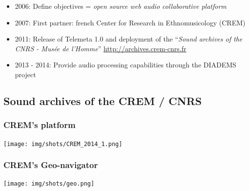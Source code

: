 \documentclass[10pt, final, hyperref, table]{beamer}
\newcommand{\dchref}[1]{
    \href{#1}{\color{rouge}\underline{#1}}
}
\begin{document}
\begin{frame}
\begin{block}
\begin{itemize}
      \item \alert{2006}: Define objectives = \emph{open source web
          audio collaborative platform}
      \item \alert{2007}: First partner: french Center for Research in
        Ethnomusicology (CREM)
      \item \alert{2011}: Release of \alert{Telemeta 1.0} and
        deployment of the ``\emph{Sound archives of the CNRS
          - Musée de l'Homme}'' \dchref{http://archives.crem-cnrs.fr}
      \item \alert{2013 - 2014}: Provide audio processing capabilities through the DIADEMS project 
      \end{itemize}
    \end{block}
  
\end{frame}




\subsection{Sound archives of the CREM / CNRS}
\begin{frame}
  \frametitle{CREM's platform}
  \begin{center}
    \texttt{[image: img/shots/CREM\_2014\_1.png]}
  \end{center}
\end{frame}

\begin{frame}
  \frametitle{CREM's Geo-navigator}
  \begin{center}
    \texttt{[image: img/shots/geo.png]}
  \end{center}
\end{frame}
\end{document}
